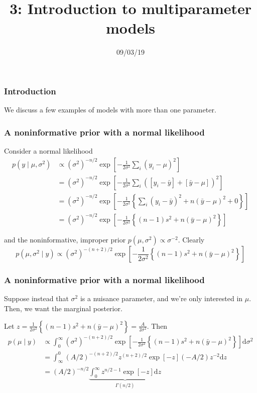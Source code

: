 \documentclass{beamer}
\title["3"]{3: Introduction to multiparameter models}
\date{09/03/19}
\begin{document}

\begin{frame}
\titlepage 
\end{frame}

\begin{frame}
\frametitle{Introduction}

We discuss a few examples of models with more than one parameter.


\end{frame}


\begin{frame}
\frametitle{A noninformative prior with a normal likelihood}

Consider a normal likelihood
\begin{align*}
p(y \mid \mu, \sigma^2) &\propto (\sigma^2)^{-n/2}\exp\left[ - \frac{1}{2\sigma^2} \sum_i(y_i- \mu)^2 \right] \\
&= (\sigma^2)^{-n/2}\exp\left[ - \frac{1}{2\sigma^2} \sum_i([y_i- \bar{y}] + [\bar{y} - \mu])^2 \right] \\
&= (\sigma^2)^{-n/2}\exp\left[ - \frac{1}{2\sigma^2} \left\{ \sum_i(y_i- \bar{y})^2 + n(\bar{y} - \mu)^2 + 0 \right\} \right] \\
&= (\sigma^2)^{-n/2} \exp\left[ - \frac{1}{2\sigma^2}\left\{(n-1)  s^2 + n(\bar{y} - \mu)^2 \right\} \right]
\end{align*}

and the noninformative, improper prior $p(\mu, \sigma^2) \propto \sigma^{-2}$. Clearly 
\[
p(\mu, \sigma^2 \mid y) \propto (\sigma^2)^{-(n+2)/2}\exp\left[ - \frac{1}{2\sigma^2}\left\{(n-1)  s^2 + n(\bar{y} - \mu)^2 \right\} \right]
\]

\end{frame}
\begin{frame}
\frametitle{A noninformative prior with a normal likelihood}

Suppose instead that $\sigma^2$ is a nuisance parameter, and we're only interested in $\mu$. Then, we want the marginal posterior.
\newline

Let $z = \frac{1}{2\sigma^2}\left\{(n-1)  s^2 + n(\bar{y} - \mu)^2 \right\} = \frac{A}{2\sigma^2}$. Then
\begin{align*}
p(\mu \mid y) &\propto \int_0^{\infty} (\sigma^2)^{-(n+2)/2} \exp\left[ - \frac{1}{2\sigma^2}\left\{(n-1)  s^2 + n(\bar{y} - \mu)^2 \right\} \right] \text{d} \sigma^2 \\
&= \int_{\infty}^0 (A/2)^{-(n+2)/2}z^{(n+2)/2} \exp\left[ - z \right] (-A/2)z^{-2}\text{d} z \\
&= (A/2)^{-n/2} \underbrace{\int^{\infty}_0 z^{n/2-1} \exp\left[ - z \right] \text{d} z}_{\Gamma(n/2)} \\
\end{align*}


\end{frame}
\end{document}
